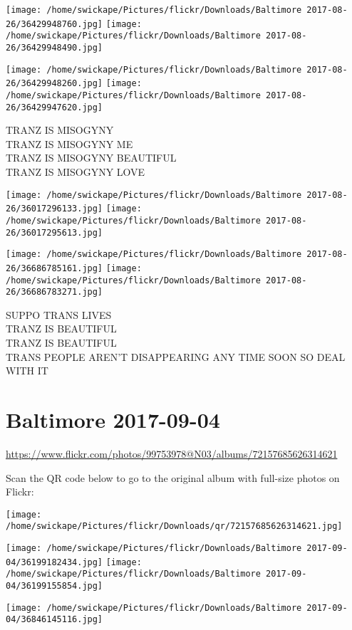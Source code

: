 \documentclass[10pt,letterpaper]{article}
\begin{document}
\texttt{[image: /home/swickape/Pictures/flickr/Downloads/Baltimore 2017-08-26/36429948760.jpg]}
\texttt{[image: /home/swickape/Pictures/flickr/Downloads/Baltimore 2017-08-26/36429948490.jpg]}

\texttt{[image: /home/swickape/Pictures/flickr/Downloads/Baltimore 2017-08-26/36429948260.jpg]}
\texttt{[image: /home/swickape/Pictures/flickr/Downloads/Baltimore 2017-08-26/36429947620.jpg]}

TRANZ IS MISOGYNY\\
TRANZ IS MISOGYNY ME\\
TRANZ IS MISOGYNY BEAUTIFUL\\
TRANZ IS MISOGYNY LOVE
\pagebreak

\texttt{[image: /home/swickape/Pictures/flickr/Downloads/Baltimore 2017-08-26/36017296133.jpg]}
\texttt{[image: /home/swickape/Pictures/flickr/Downloads/Baltimore 2017-08-26/36017295613.jpg]}

\texttt{[image: /home/swickape/Pictures/flickr/Downloads/Baltimore 2017-08-26/36686785161.jpg]}
\texttt{[image: /home/swickape/Pictures/flickr/Downloads/Baltimore 2017-08-26/36686783271.jpg]}

SUPPO TRANS LIVES\\
TRANZ IS BEAUTIFUL\\
TRANZ IS BEAUTIFUL\\
TRANS PEOPLE AREN'T DISAPPEARING ANY TIME SOON SO DEAL WITH IT
\pagebreak

\section*{Baltimore 2017-09-04}

\url{https://www.flickr.com/photos/99753978@N03/albums/72157685626314621}

Scan the QR code below to go to the original album with full-size photos on Flickr:

\texttt{[image: /home/swickape/Pictures/flickr/Downloads/qr/72157685626314621.jpg]}
\pagebreak

\texttt{[image: /home/swickape/Pictures/flickr/Downloads/Baltimore 2017-09-04/36199182434.jpg]}
\texttt{[image: /home/swickape/Pictures/flickr/Downloads/Baltimore 2017-09-04/36199155854.jpg]}

\vspace{0.25in}
\texttt{[image: /home/swickape/Pictures/flickr/Downloads/Baltimore 2017-09-04/36846145116.jpg]}
\end{document}
